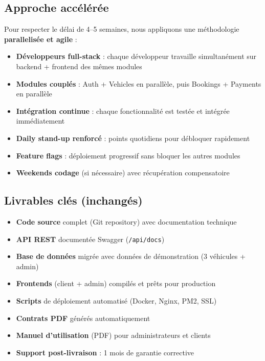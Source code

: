 \documentclass[12pt, a4paper]{article}
\begin{document}
\subsection{Approche accélérée}

Pour respecter le délai de 4--5 semaines, nous appliquons une méthodologie \textbf{parallelisée et agile} :
\begin{itemize}[leftmargin=*,noitemsep]
  \item \textbf{Développeurs full-stack} : chaque développeur travaille simultanément sur backend + frontend des mêmes modules
  \item \textbf{Modules couplés} : Auth + Vehicles en parallèle, puis Bookings + Payments en parallèle
  \item \textbf{Intégration continue} : chaque fonctionnalité est testée et intégrée immédiatement
  \item \textbf{Daily stand-up renforcé} : points quotidiens pour débloquer rapidement
  \item \textbf{Feature flags} : déploiement progressif sans bloquer les autres modules
  \item \textbf{Weekends codage} (si nécessaire) avec récupération compensatoire
\end{itemize}

\subsection{Livrables clés (inchangés)}

\begin{itemize}[leftmargin=*,noitemsep]
  \item \textbf{Code source} complet (Git repository) avec documentation technique
  \item \textbf{API REST} documentée Swagger (\texttt{/api/docs})
  \item \textbf{Base de données} migrée avec données de démonstration (3 véhicules + admin)
  \item \textbf{Frontends} (client + admin) compilés et prêts pour production
  \item \textbf{Scripts} de déploiement automatisé (Docker, Nginx, PM2, SSL)
  \item \textbf{Contrats PDF} générés automatiquement
  \item \textbf{Manuel d'utilisation} (PDF) pour administrateurs et clients
  \item \textbf{Support post-livraison} : 1 mois de garantie corrective
\end{itemize}
\end{document}
